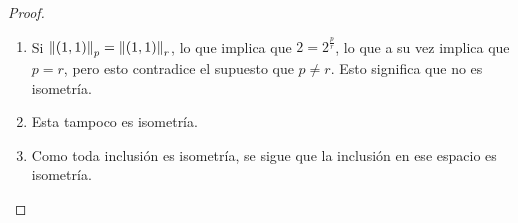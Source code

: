 \documentclass[12pt]{article}
\begin{document}
\begin{enumerate}[label=\textbf{\arabic*}.]
\begin{proof}
    \begin{enumerate}
        \item Si $\norm{(1,1)}_p = \norm{(1,1)}_r$, lo que implica que $2 = 2^{\frac{p}{r}}$, lo que a su vez implica que $p = r$, pero esto contradice el supuesto que $p \neq r$. Esto significa que no es isometría. 
        \item Esta tampoco es isometría. 
        \item Como toda inclusión es isometría, se sigue que la inclusión en ese espacio es isometría. 
    \end{enumerate}
\end{proof}
\end{enumerate}
\end{document}

